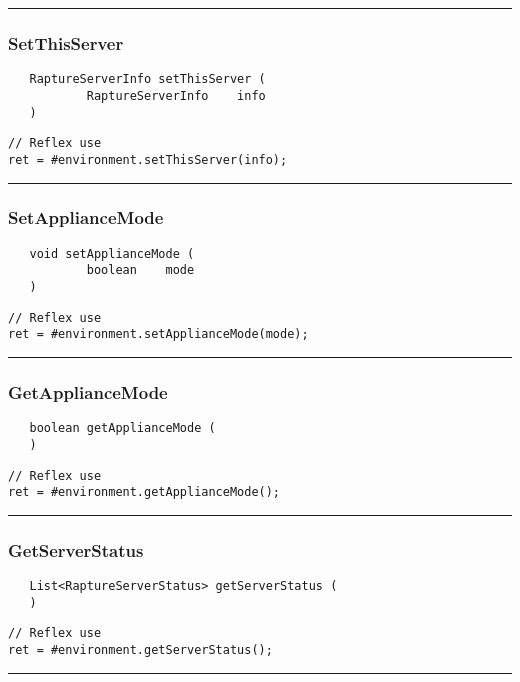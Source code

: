 \rule{15cm}{2pt}
\subsubsection{SetThisServer}
\label{Api:SetThisServer}
\begin{verbatim}
   RaptureServerInfo setThisServer (
           RaptureServerInfo    info
   )
\end{verbatim}
\begin{lstlisting}[language=reflex]
// Reflex use
ret = #environment.setThisServer(info);
\end{lstlisting}



\rule{15cm}{2pt}
\subsubsection{SetApplianceMode}
\label{Api:SetApplianceMode}
\begin{verbatim}
   void setApplianceMode (
           boolean    mode
   )
\end{verbatim}
\begin{lstlisting}[language=reflex]
// Reflex use
ret = #environment.setApplianceMode(mode);
\end{lstlisting}



\rule{15cm}{2pt}
\subsubsection{GetApplianceMode}
\label{Api:GetApplianceMode}
\begin{verbatim}
   boolean getApplianceMode (
   )
\end{verbatim}
\begin{lstlisting}[language=reflex]
// Reflex use
ret = #environment.getApplianceMode();
\end{lstlisting}



\rule{15cm}{2pt}
\subsubsection{GetServerStatus}
\label{Api:GetServerStatus}
\begin{verbatim}
   List<RaptureServerStatus> getServerStatus (
   )
\end{verbatim}
\begin{lstlisting}[language=reflex]
// Reflex use
ret = #environment.getServerStatus();
\end{lstlisting}



\rule{15cm}{2pt}
